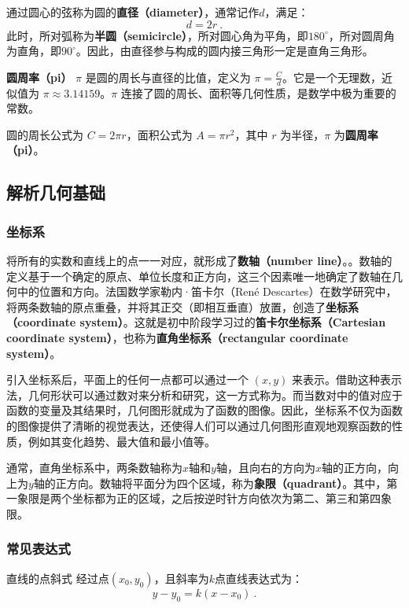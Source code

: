 通过圆心的弦称为圆的\textbf{直径（diameter）}，通常记作$d$，满足：
\begin{equation}
d = 2r~.
\end{equation}
此时，所对弧称为\textbf{半圆（semicircle）}，所对圆心角为平角，即$180^\circ$，所对圆周角为直角，即$90^\circ$。因此，由直径参与构成的圆内接三角形一定是直角三角形。


\textbf{圆周率（pi）} $\pi$ 是圆的周长与直径的比值，定义为 $\pi = \frac{C}{d}$。它是一个无理数，近似值为 $\pi \approx 3.14159$。$\pi$ 连接了圆的周长、面积等几何性质，是数学中极为重要的常数。

圆的周长公式为 $C = 2\pi r$，面积公式为 $A = \pi r^2$，其中 $r$ 为半径，$\pi$ 为\textbf{圆周率（pi）}。

\subsection{解析几何基础}

\subsubsection{坐标系}
将所有的实数和直线上的点一一对应，就形成了\textbf{数轴（number line）}。。数轴的定义基于一个确定的原点、单位长度和正方向，这三个因素唯一地确定了数轴在几何中的位置和方向。法国数学家勒内·笛卡尔（René Descartes）在数学研究中，将两条数轴的原点重叠，并将其正交（即相互垂直）放置，创造了\textbf{坐标系（coordinate system）}。这就是初中阶段学习过的\textbf{笛卡尔坐标系（Cartesian coordinate system）}，也称为\textbf{直角坐标系（rectangular coordinate system）}。

引入坐标系后，平面上的任何一点都可以通过一个 $(x, y)$ 来表示。借助这种表示法，几何形状可以通过数对来分析和研究，这一方式称为。而当数对中的值对应于函数的变量及其结果时，几何图形就成为了函数的图像。因此，坐标系不仅为函数的图像提供了清晰的视觉表达，还使得人们可以通过几何图形直观地观察函数的性质，例如其变化趋势、最大值和最小值等。

通常，直角坐标系中，两条数轴称为$x$轴和$y$轴，且向右的方向为$x$轴的正方向，向上为$y$轴的正方向。数轴将平面分为四个区域，称为\textbf{象限（quadrant）}。其中，第一象限是两个坐标都为正的区域，之后按逆时针方向依次为第二、第三和第四象限。

\subsubsection{常见表达式}

\begin{definition}{直线的点斜式}\label{def_HsGeBa_1}
经过点$(x_0,y_0)$，且斜率为$k$点直线表达式为：
\begin{equation}
y-y_0=k(x-x_0)~.
\end{equation}
\end{definition}

